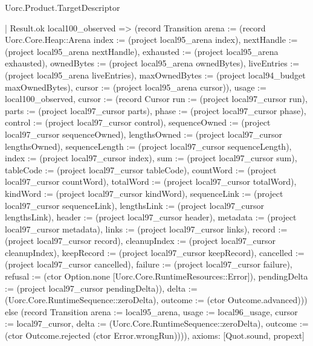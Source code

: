 \begin{lexlean}{Uorc.Product.TargetDescriptor}
\begin{semanticmodule}
{    | Result.ok local100_observed => (record Transition {arena := (record Uorc.Core.Heap::Arena {index := (project local95_arena index), nextHandle := (project local95_arena nextHandle), exhausted := (project local95_arena exhausted), ownedBytes := (project local95_arena ownedBytes), liveEntries := (project local95_arena liveEntries), maxOwnedBytes := (project local94_budget maxOwnedBytes), cursor := (project local95_arena cursor)}), usage := local100_observed, cursor := (record Cursor {run := (project local97_cursor run), parts := (project local97_cursor parts), phase := (project local97_cursor phase), control := (project local97_cursor control), sequenceOwned := (project local97_cursor sequenceOwned), lengthsOwned := (project local97_cursor lengthsOwned), sequenceLength := (project local97_cursor sequenceLength), index := (project local97_cursor index), sum := (project local97_cursor sum), tableCode := (project local97_cursor tableCode), countWord := (project local97_cursor countWord), totalWord := (project local97_cursor totalWord), kindWord := (project local97_cursor kindWord), sequenceLink := (project local97_cursor sequenceLink), lengthsLink := (project local97_cursor lengthsLink), header := (project local97_cursor header), metadata := (project local97_cursor metadata), links := (project local97_cursor links), record := (project local97_cursor record), cleanupIndex := (project local97_cursor cleanupIndex), keepRecord := (project local97_cursor keepRecord), cancelled := (project local97_cursor cancelled), failure := (project local97_cursor failure), refusal := (ctor Option.none [Uorc.Core.RuntimeResources::Error]), pendingDelta := (project local97_cursor pendingDelta)}), delta := (Uorc.Core.RuntimeSequence::zeroDelta), outcome := (ctor Outcome.advanced)})) else (record Transition {arena := local95_arena, usage := local96_usage, cursor := local97_cursor, delta := (Uorc.Core.RuntimeSequence::zeroDelta), outcome := (ctor Outcome.rejected (ctor Error.wrongRun))})),
  axioms: [Quot.sound, propext]
}


\end{semanticmodule}
\end{lexlean}
